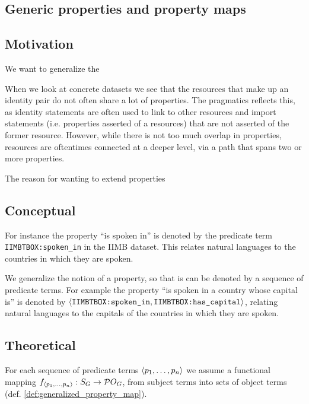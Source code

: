 \subsection{Generic properties and property maps}

\subsection{Motivation}

We want to generalize the 

When we look at concrete datasets we see that the resources that make up
  an identity pair do not often share a lot of properties.
The pragmatics reflects this, as identity statements are often used
  to link to other resources and import statements
  (i.e. properties asserted of a resources)
  that are not asserted of the former resource.
However, while there is not too much overlap in properties,
  resources are oftentimes connected at a deeper level,
  via a path that spans two or more properties.

The reason for wanting to extend properties 

\subsection{Conceptual}

For instance the property ``is spoken in'' is denoted by
  the predicate term \verb|IIMBTBOX:spoken_in| in the IIMB dataset.
This relates natural languages to the countries in which they are spoken.

We generalize the notion of a property,
  so that is can be denoted by a sequence of predicate terms.
For example the property ``is spoken in a country whose capital is''
  is denoted by
  $\langle\texttt{IIMBTBOX:spoken\_in},\texttt{IIMBTBOX:has\_capital}\rangle$,
  relating natural languages to the capitals of the countries in which
  they are spoken.

\subsection{Theoretical}

For each sequence of predicate terms $\langle p_1,\ldots,p_n\rangle$
  we assume a functional mapping
  $f_{\langle p_1,\ldots,p_n\rangle} : S_G \rightarrow \mathcal{P}{O_G}$,
  from subject terms into sets of object terms
  (def. \ref{def:generalized_property_map}).


